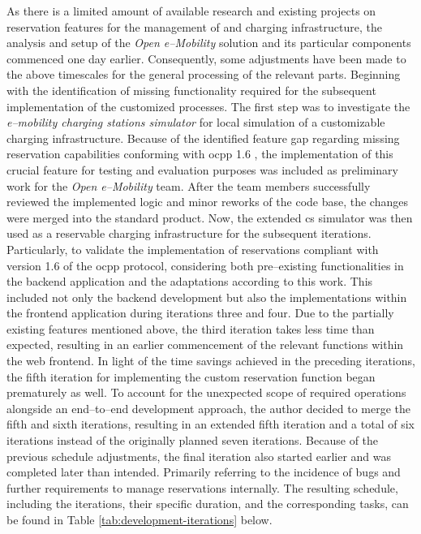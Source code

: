 As there is a limited amount of available research and existing projects on reservation features for the management of  and charging infrastructure, the analysis and setup of the \textit{Open e--Mobility} \cite{noauthor_github_nodate,noauthor_github_nodate-1,noauthor_github_nodate-2,noauthor_github_nodate-3} solution and its particular components commenced one day earlier.
Consequently, some adjustments have been made to the above timescales for the general processing of the relevant parts.
Beginning with the identification of missing functionality required for the subsequent implementation of the customized processes.
The first step was to investigate the \textit{e--mobility charging stations simulator} \cite{noauthor_github_nodate-3} for local simulation of a customizable charging infrastructure.
Because of the identified feature gap regarding missing reservation capabilities conforming with \acrshort{ocpp} 1.6 \cite{noauthor_ocpp_nodate}, the implementation of this crucial feature for testing and evaluation purposes was included as preliminary work for the \textit{Open e--Mobility} team.
After the team members successfully reviewed the implemented logic and minor reworks of the code base, the changes were merged into the standard product.
Now, the extended \acrshort{cs} simulator was then used as a reservable charging infrastructure for the subsequent iterations.
Particularly, to validate the implementation of reservations compliant with version 1.6 of the \acrshort{ocpp} protocol, considering both pre--existing functionalities in the backend application and the adaptations according to this work.
This included not only the backend development but also the implementations within the frontend application during iterations three and four.
Due to the partially existing features mentioned above, the third iteration takes less time than expected, resulting in an earlier commencement of the relevant functions within the web frontend.
In light of the time savings achieved in the preceding iterations, the fifth iteration for implementing the custom reservation function began prematurely as well. 
To account for the unexpected scope of required operations alongside an end--to--end development approach, the author decided to merge the fifth and sixth iterations, resulting in an extended fifth iteration and a total of six iterations instead of the originally planned seven iterations.
Because of the previous schedule adjustments, the final iteration also started earlier and was completed later than intended. 
Primarily referring to the incidence of bugs and further requirements to manage reservations internally.
The resulting schedule, including the iterations, their specific duration, and the corresponding tasks, can be found in Table \ref{tab:development-iterations} below.

